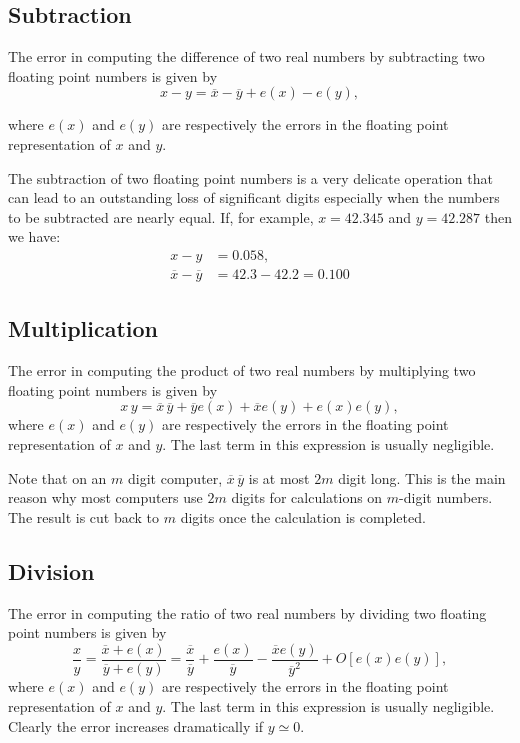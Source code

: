 \subsection{Subtraction}

The error in computing the difference of two real numbers by subtracting
two floating point numbers is given by
%
\begin{equation*}
  x - y = \overline{x} - \overline{y} + e(x) - e(y),
\end{equation*}

%
where $e(x)$ and $e(y)$ are respectively the errors in the floating
point representation of $x$ and $y$.

The subtraction of two floating point numbers is a very delicate
operation that can lead to an outstanding loss of significant digits
especially when the numbers to be subtracted are nearly equal.
If, for example, $x = 42.345$ and $y = 42.287$ then we have:
%
\begin{align*}
  x - y &= 0.058 , \\
  \overline{x} - \overline{y} &= 42.3 - 42.2 = 0.100
\end{align*}

\subsection{Multiplication}

The error in computing the product of two real numbers by multiplying
two floating point numbers is given by
%
\begin{equation*}
  x \, y = \overline{x} \, \overline{y} + \overline{y} e(x) + 
  \overline{x} e(y) + e(x) e(y), 
\end{equation*}
%
where $e(x)$ and $e(y)$ are respectively the errors in the floating
point representation of $x$ and $y$.   The last term in this
expression is usually negligible.

Note that on an $m$ digit computer,  $\overline{x} \, \overline{y}$ is at
most $2 m$ digit long.  This is the main reason why most computers use
$2 m$ digits for calculations on $m$-digit numbers.  The result is cut
back to $m$ digits once the calculation is completed.

\subsection{Division}

The error in computing the ratio of two real numbers by dividing
two floating point numbers is given by
%
\begin{equation*}
  \frac{x}{y} = 
  \frac{\overline{x} + e(x)}{\overline{y} + e(y)} =
  \frac{\overline{x}}{\overline{y}} + \frac{e(x)}{\overline{y}} -
  \frac{\overline{x} e(y)}{\overline{y}^2} + O [e(x) e(y)],
\end{equation*}
%
where $e(x)$ and $e(y)$ are respectively the errors in the floating
point representation of $x$ and $y$.   The last term in this
expression is usually negligible.   Clearly the error increases
dramatically if $y \simeq 0$.

